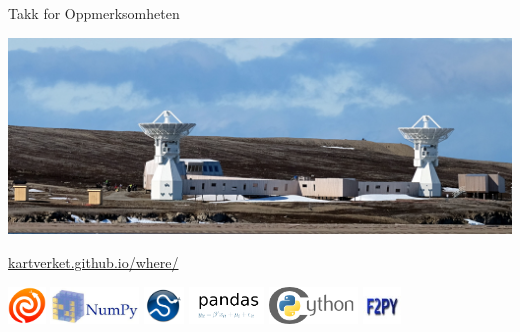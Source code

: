 \documentclass[12pt,table,t]{beamer}
\begin{document}
\begin{frame}[c]{Takk for Oppmerksomheten}
  \begin{center}
    \includegraphics[width=\textwidth]{figure/ny_alesund}

    {\large\url{kartverket.github.io/where/}}
    \vspace*{1.3cm}

    \includegraphics[height=1cm]{figure/logo_astropy} \hfil
    \includegraphics[height=1cm]{figure/logo_numpy} \hfil
    \includegraphics[height=1cm]{figure/logo_scipy} \hfil
    \includegraphics[height=1cm]{figure/logo_pandas} \hfil
    \includegraphics[height=1cm]{figure/logo_cython} \hfil
    \includegraphics[height=1cm]{figure/logo_f2py}
  \end{center}
\end{frame}
\end{document}
